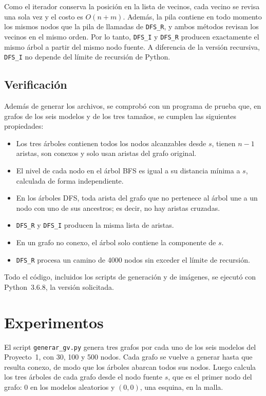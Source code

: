 \documentclass[11pt,letterpaper]{article}
\begin{document}
Como el iterador conserva la posición en la lista de vecinos, cada vecino se revisa
una sola vez y el costo es $O(n + m)$. Además, la pila contiene en todo momento los
mismos nodos que la pila de llamadas de \texttt{DFS\_R}, y ambos métodos revisan
los vecinos en el mismo orden. Por lo tanto, \texttt{DFS\_I} y \texttt{DFS\_R}
producen exactamente el mismo árbol a partir del mismo nodo fuente. A diferencia de
la versión recursiva, \texttt{DFS\_I} no depende del límite de recursión de Python.

\subsection{Verificación}

Además de generar los archivos, se comprobó con un programa de prueba que, en
grafos de los seis modelos y de los tres tamaños, se cumplen las siguientes
propiedades:

\begin{itemize}
    \item Los tres árboles contienen todos los nodos alcanzables desde $s$, tienen
          $n - 1$ aristas, son conexos y solo usan aristas del grafo original.
    \item El nivel de cada nodo en el árbol BFS es igual a su distancia mínima a $s$,
          calculada de forma independiente.
    \item En los árboles DFS, toda arista del grafo que no pertenece al árbol une a
          un nodo con uno de sus ancestros; es decir, no hay aristas cruzadas.
    \item \texttt{DFS\_R} y \texttt{DFS\_I} producen la misma lista de aristas.
    \item En un grafo no conexo, el árbol solo contiene la componente de $s$.
    \item \texttt{DFS\_R} procesa un camino de 4000 nodos sin exceder el límite de
          recursión.
\end{itemize}

Todo el código, incluidos los scripts de generación y de imágenes, se ejecutó con
Python~3.6.8, la versión solicitada.

\section{Experimentos}

El script \texttt{generar\_gv.py} genera tres grafos por cada uno de los seis
modelos del Proyecto~1, con 30, 100 y 500 nodos. Cada grafo se vuelve a generar
hasta que resulta conexo, de modo que los árboles abarcan todos sus nodos. Luego
calcula los tres árboles de cada grafo desde el nodo fuente $s$, que es el primer
nodo del grafo: $0$ en los modelos aleatorios y $(0, 0)$, una esquina, en la malla.
\end{document}
